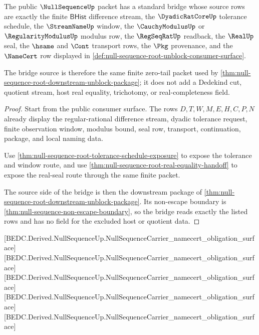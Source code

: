 \begin{theorem}
\label{thm:null-sequence-standard-bridge-package}
The public $\NullSequenceUp$ packet has a standard bridge whose source rows are exactly the finite $\mathsf{BHist}$ difference stream, the $\DyadicRatCoreUp$ tolerance schedule, the $\StreamNameUp$ window, the $\CauchyModulusUp$ or $\RegularityModulusUp$ modulus row, the $\RegSeqRatUp$ readback, the $\RealUp$ seal, the $\hsame$ and $\Cont$ transport rows, the $\Pkg$ provenance, and the $\NameCert$ row displayed in \autoref{def:null-sequence-root-unblock-consumer-surface}.

The bridge source is therefore the same finite zero-tail packet used by \autoref{thm:null-sequence-root-downstream-unblock-package}; it does not add a Dedekind cut, quotient stream, host real equality, trichotomy, or real-completeness field.
\end{theorem}
\begin{proof}
Start from the public consumer surface. The rows $D,T,W,M,E,H,C,P,N$ already display the regular-rational difference stream, dyadic tolerance request, finite observation window, modulus bound, seal row, transport, continuation, package, and local naming data.

Use \autoref{thm:null-sequence-root-tolerance-schedule-exposure} to expose the tolerance and window route, and use \autoref{thm:null-sequence-root-real-equality-handoff} to expose the real-seal route through the same finite packet.

The source side of the bridge is then the downstream package of \autoref{thm:null-sequence-root-downstream-unblock-package}. Its non-escape boundary is \autoref{thm:null-sequence-non-escape-boundary}, so the bridge reads exactly the listed rows and has no field for the excluded host or quotient data.
\end{proof}

[BEDC.Derived.NullSequenceUp.NullSequenceCarrier\_namecert\_obligation\_surface]
[BEDC.Derived.NullSequenceUp.NullSequenceCarrier\_namecert\_obligation\_surface]
[BEDC.Derived.NullSequenceUp.NullSequenceCarrier\_namecert\_obligation\_surface]
[BEDC.Derived.NullSequenceUp.NullSequenceCarrier\_namecert\_obligation\_surface]
[BEDC.Derived.NullSequenceUp.NullSequenceCarrier\_namecert\_obligation\_surface]

